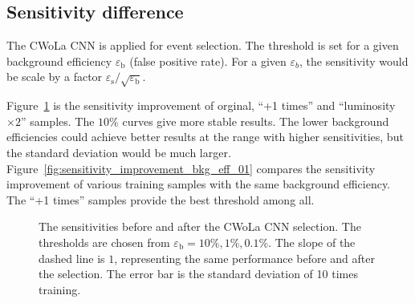 \documentclass[12pt]{article}
\begin{document}
    \subsection{Sensitivity difference}%
    \label{sub:sensitivity_difference}
        The CWoLa CNN is applied for event selection. The threshold is set for a given background efficiency $\varepsilon_{\text{b}}$ (false positive rate). For a given $\varepsilon_b$, the sensitivity would be scale by a factor ${\varepsilon_\text{s}} / {\sqrt{\varepsilon_{\text{b}}}}$.

        Figure~\ref{fig:sensitivity_improvement_origin_aug_1_x2} is the sensitivity improvement of orginal, ``+1 times'' and ``luminosity $\times 2$'' samples. The $10\%$ curves give more stable results. The lower background efficiencies could achieve better results at the range with higher sensitivities, but the standard deviation would be much larger. Figure~\ref{fig:sensitivity_improvement_bkg_eff_01} compares the sensitivity improvement of various training samples with the same background efficiency. The ``+1 times'' samples provide the best threshold among all.

        \begin{figure}[htpb]
            \centering
            \caption{The sensitivities before and after the CWoLa CNN selection. The thresholds are chosen from $\varepsilon_{\text{b}} = 10\%, 1\%, 0.1\%$. The slope of the dashed line is $1$, representing the same performance before and after the selection. The error bar is the standard deviation of 10 times training.}
            \label{fig:sensitivity_improvement_origin_aug_1_x2}
        \end{figure}
\end{document}
